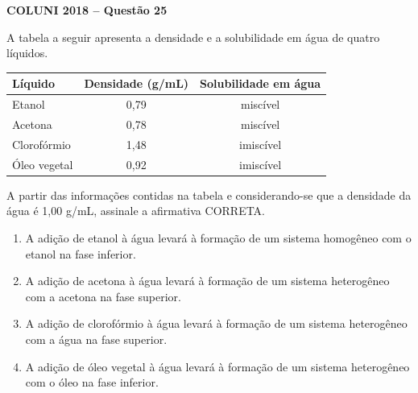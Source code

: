 \textbf{COLUNI 2018 -- Questão 25}\par\medskip A tabela a seguir apresenta a densidade e a solubilidade em água de quatro líquidos.

\par

\begin{center}
\begin{tabular}{lcc}
\hline
\textbf{Líquido} & \textbf{Densidade (g/mL)} & \textbf{Solubilidade em água} \\
\hline
Etanol & 0,79 & miscível \\
Acetona & 0,78 & miscível \\
Clorofórmio & 1,48 & imiscível \\
Óleo vegetal & 0,92 & imiscível \\
\hline
\end{tabular}
\end{center}
\par

A partir das informações contidas na tabela e considerando-se que a densidade da água é 1,00 g/mL, assinale a afirmativa CORRETA.\begin{enumerate}
\item A adição de etanol à água levará à formação de um sistema homogêneo com o etanol na fase inferior.
\item A adição de acetona à água levará à formação de um sistema heterogêneo com a acetona na fase superior.
\item A adição de clorofórmio à água levará à formação de um sistema heterogêneo com a água na fase superior.
\item A adição de óleo vegetal à água levará à formação de um sistema heterogêneo com o óleo na fase inferior.\end{enumerate}
